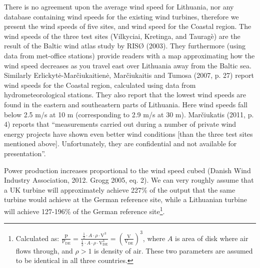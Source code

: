 \documentclass[a4paper, 12pt]{article}
\begin{document}
There is no agreement upon the average wind speed for Lithuania, nor any database containing wind speeds for the existing wind turbines, therefore we present the wind speeds of five sites, and wind speed for the Coastal region. The wind speeds of the three test sites (Vilkyciai, Kretinga, and Tauragè) are the result of the Baltic wind atlas study by RISØ (2003). They furthermore (using data from met-office stations) provide readers with a map approximating how the wind speed decreases as you travel east over Lithuania away from the Baltic sea. Similarly Erlickytė-Marčiukaitienė, Marčiukaitis and Tumosa (2007, p. 27) report wind speeds for the Coastal region, calculated using data from hydrometeorological stations. They also report that the lowest wind speeds are found in the eastern and southeastern parts of Lithuania. Here wind speeds fall below 2.5 m/s at 10 m (corresponding to 2.9 m/s at 30 m). Marčiukatis (2011, p. 4) reports that ``measurements carried out during a number of private wind energy projects have shown even better wind conditions [than the three test sites mentioned above]. Unfortunately, they are confidential and not available for presentation''.

Power production increases proportional to the wind speed cubed (Danish Wind Industry Association, 2012. Grogg 2005, eq. 2). We can very roughly assume that a UK turbine will approximately achieve 227\% of the output that the same turbine would achieve at the German reference site, while a Lithuanian turbine will achieve 127-196\% of the German reference site\footnote{Calculated as: $\frac{\text{P}}{\text{P}_\text{DE}} = \frac{\frac{1}{2} \cdot A \cdot \rho \cdot \text{V}^3}{\frac{1}{2} \cdot A \cdot \rho \cdot \text{V}_\text{DE}^3} = \left(\frac{\text{V}}{\text{V}_\text{DE}}\right)^3$, where $A$ is area of disk where air flows through, and $\rho > 1$ is density of air. These two parameters are  assumed to be identical in all three countries.}.
\end{document}
